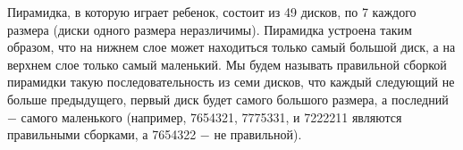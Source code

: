 \question
Пирамидка, в которую играет ребенок, состоит из 49 дисков, по 7 каждого размера (диски одного размера неразличимы). Пирамидка устроена таким образом, что на нижнем слое может находиться только самый большой диск, а на верхнем слое только самый маленький. Мы будем называть правильной сборкой пирамидки такую последовательность из семи дисков, что каждый следующий не больше предыдущего, первый диск будет самого большого размера, а последний $-$ самого маленького (например, 7654321, 7775331, и 7222211 являются правильными сборками, а 7654322 $-$ не правильной).
